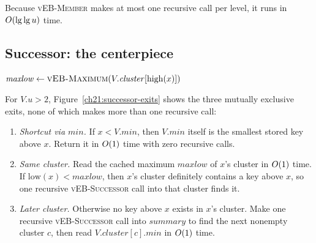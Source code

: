\begin{algorithm}[H]
\caption{\textsc{vEB-Member}($V, x$)}
\end{algorithm}

Because \textsc{vEB-Member} makes at most one recursive call per level, it runs in $O(\lg\lg u)$ time.

\subsection{Successor: the centerpiece}

\begin{algorithm}[H]
\caption{\textsc{vEB-Successor}($V, x$)}
$\mathit{maxlow} \leftarrow \textsc{vEB-Maximum}(V.\mathit{cluster}[\mathrm{high}(x)])$\;
\end{algorithm}

For $V.u > 2$, Figure~\ref{ch21:successor-exits} shows the three mutually exclusive exits, none of which makes more than one recursive call:

\begin{enumerate}
  \item \emph{Shortcut via $\mathit{min}$.} If $x < V.\mathit{min}$, then $V.\mathit{min}$ itself is the smallest stored key above $x$. Return it in $O(1)$ time with zero recursive calls.
  \item \emph{Same cluster.} Read the cached maximum $\mathit{maxlow}$ of $x$'s cluster in $O(1)$ time. If $\mathrm{low}(x) < \mathit{maxlow}$, then $x$'s cluster definitely contains a key above $x$, so one recursive \textsc{vEB-Successor} call into that cluster finds it.
  \item \emph{Later cluster.} Otherwise no key above $x$ exists in $x$'s cluster. Make one recursive \textsc{vEB-Successor} call into $\mathit{summary}$ to find the next nonempty cluster $c$, then read $V.\mathit{cluster}[c].\mathit{min}$ in $O(1)$ time.
\end{enumerate}

